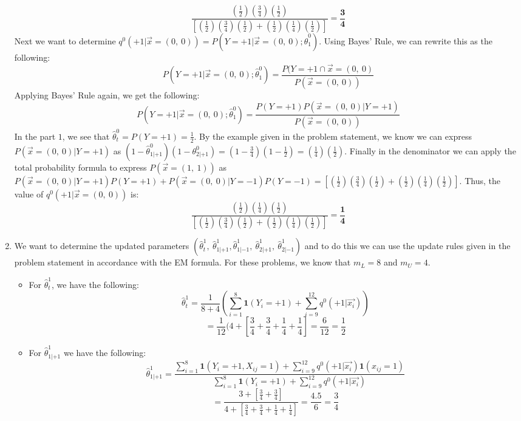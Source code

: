 \documentclass[english]{article}
\begin{document}
\begin{enumerate}
$$\frac{(\frac{1}{2})(\frac{3}{4})(\frac{1}{2})}{[(\frac{1}{2})(\frac{3}{4})(\frac{1}{2}) + (\frac{1}{2})(\frac{1}{4})(\frac{1}{2})]} = \mathbf{\frac{3}{4}}$$\newline\newline
Next we want to determine $q^0(+1 | \vec{x} = (0,\:0)) = P(Y=+1 | \vec{x} = (0,\:0); \hat{\theta}^0_1)$. Using Bayes' Rule, we can rewrite this as the following: $$P(Y=+1 | \vec{x} = (0,\:0); \hat{\theta}^0_1) = \frac{P(Y = +1 \cap \vec{x} = (0, \: 0)}{P(\vec{x} = (0, \: 0))}$$
Applying Bayes' Rule again, we get the following: 
$$P(Y=+1 | \vec{x} =  (0, \: 0); \hat{\theta}^0_1) = \frac{P(Y = +1)P(\vec{x} =  (0, \: 0) | Y=+1)}{P(\vec{x} = (0, \: 0))}$$
In the part $1$, we see that $\hat{\theta}^0_t = P(Y = +1) = \frac{1}{2}$. By the example given in the problem statement, we know we can express $P(\vec{x} = (0, \: 0) | Y=+1)$ as $(1 - \hat{\theta}^0_{1|+1})(1 - \theta^0_{2|+1}) = (1 - \frac{3}{4})(1 - \frac{1}{2}) = (\frac{1}{4})(\frac{1}{2})$. Finally in the denominator we can apply the total probability formula to express $P(\vec{x} = (1, \: 1))$ as $P(\vec{x} = (0, \: 0)|Y = +1)P(Y = +1) + P(\vec{x} = (0, \: 0)|Y=-1)P(Y=-1) = [(\frac{1}{2})(\frac{3}{4})(\frac{1}{2}) + (\frac{1}{2})(\frac{1}{4})(\frac{1}{2})]$. Thus, the value of $q^0(+1 | \vec{x} = (0, \: 0))$ is: 
$$\frac{(\frac{1}{2})(\frac{1}{4})(\frac{1}{2})}{[(\frac{1}{2})(\frac{3}{4})(\frac{1}{2}) + (\frac{1}{2})(\frac{1}{4})(\frac{1}{2})]} = \mathbf{\frac{1}{4}}$$
\item We want to determine the updated parameters $(\hat{\theta}^1_t, \: \hat{\theta}^1_{1|+1}, \hat{\theta}^1_{1|-1}, \: \hat{\theta}^1_{2|+1}, \: \hat{\theta}^1_{2|-1})$ and to do this we can use the update rules given in the problem statement in accordance with the EM formula. For these problems, we know that $m_L = 8$ and $m_U = 4$.
\begin{itemize}
\item For $\hat{\theta}^1_t$, we have the following: 
$$\hat{\theta}^1_t = \frac{1}{8+4}(\sum_{i=1}^{8} \mathbf{1}(Y_i = +1) + \sum_{i=9}^{12}q^0(+1 | \vec{x_i}))$$
$$ = \frac{1}{12}(4 + [\frac{3}{4} + \frac{3}{4} + \frac{1}{4} + \frac{1}{4}]= \frac{6}{12} = \frac{1}{2}$$

\item For $\hat{\theta}^1_{1|+1}$ we have the following: 
$$\hat{\theta}^1_{1|+1} = \frac{\sum_{i=1}^{8} \mathbf{1}(Y_i = +1, X_{ij} = 1) + \sum_{i=9}^{12}q^0(+1 | \vec{x_i})\mathbf{1}(x_{ij} = 1)}{\sum_{i=1}^{8} \mathbf{1}(Y_i = +1) + \sum_{i=9}^{12}q^0(+1 | \vec{x_i})}$$
$$ = \frac{3 + [\frac{3}{4} + \frac{3}{4}]}{4 + [\frac{3}{4} + \frac{3}{4} + \frac{1}{4} + \frac{1}{4}]} = \frac{4.5}{6} = \frac{3}{4}$$


\end{itemize}
\end{enumerate}
\end{document}
